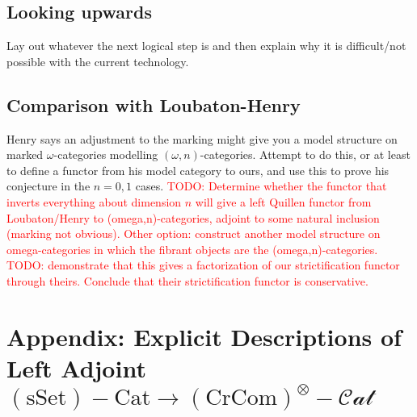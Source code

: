 \documentclass[12pt]{article}
\theoremstyle{definition}
\newcommand{\TODO}[1]{\textcolor{red}{TODO: {#1}}}
\newcommand{\crcom}{\text{CrCom}}
\newcommand{\tensorcrossedcat}{(\crcom)^\otimes-\mathcal{Cat}}
\newcommand{\ssetcat}{(\text{sSet})-\text{Cat}}
\begin{document}
	\subsection{Looking upwards}
		Lay out whatever the next logical step is and then explain why it is difficult/not possible with the current technology.
	\subsection{Comparison with Loubaton-Henry}
		Henry says an adjustment to the marking might give you a model structure on marked $\omega$-categories modelling $(\omega,n)$-categories. Attempt to do this, or at least to define a functor from his model category to ours, and use this to prove his conjecture in the $n = 0,1$ cases.
		\TODO{Determine whether the functor that inverts everything about dimension $n$ will give a left Quillen functor from Loubaton/Henry to (omega,n)-categories, adjoint to some natural inclusion (marking not obvious). Other option: construct another model structure on omega-categories in which the fibrant objects are the (omega,n)-categories.}
		\TODO{demonstrate that this gives a factorization of our strictification functor through theirs. Conclude that their strictification functor is conservative.}
		
\section{Appendix: Explicit Descriptions of Left Adjoint $\ssetcat \to \tensorcrossedcat$ }
\end{document}
